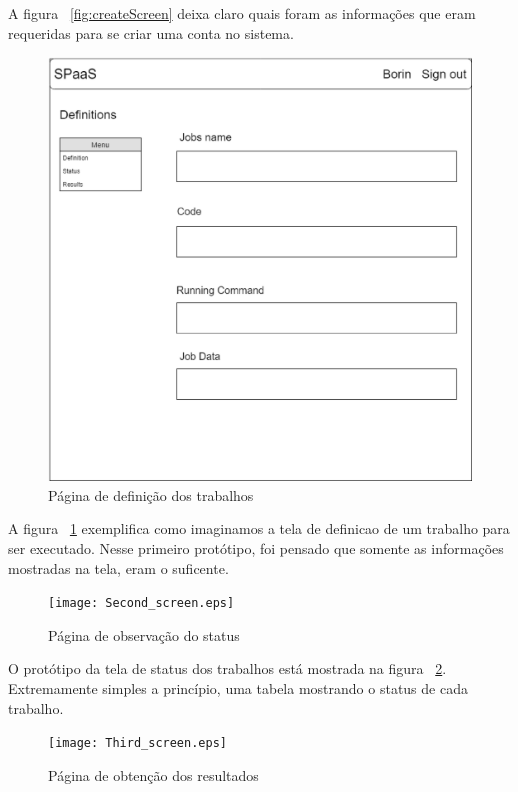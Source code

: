 \documentclass[11pt,twoside]{article}
\begin{document}
A figura ~\ref{fig:createScreen} deixa claro quais foram as informações que eram requeridas para se criar uma conta no sistema. 

\begin{figure}[!h]
  \centering
  \includegraphics[scale=0.2]{First_screen.eps}
  \caption{Página de definição dos trabalhos}
  \label{fig:definitionScreen}
\end{figure}


A figura ~\ref{fig:definitionScreen} exemplifica como imaginamos a tela de definicao de um trabalho para ser executado. Nesse primeiro protótipo, foi pensado que somente 
as informações mostradas na tela, eram o suficente.

\begin{figure}[!h]
  \centering
  \texttt{[image: Second\_screen.eps]}
  \caption{Página de observação do status}
  \label{fig:statusScreen}
\end{figure}


O protótipo da tela de status dos trabalhos está mostrada na figura ~\ref{fig:statusScreen}. Extremamente simples a princípio, uma tabela mostrando o status de cada trabalho. 

\begin{figure}[!h]
  \centering
  \texttt{[image: Third\_screen.eps]}
  \caption{Página de obtenção dos resultados}
  \label{fig:resultsScreen}
\end{figure}
\end{document}
